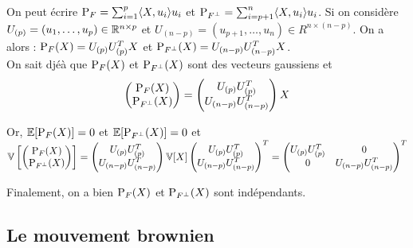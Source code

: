 On peut écrire $\mathrm{P}_F = \sum_{i=1}^p \langle X, u_i  \rangle u_i$ et $\mathrm{P}_{F^\bot} = \sum_{i=p+1}^n \langle X, u_i \rangle u_i$. Si on considère $U_{(p)} = (u_1,\ldots,u_p) \in \mathbb{R}^{n\times p}$ et $U_{(n-p)} = (u_{p+1},\ldots,u_{n}) \in R^{n \times (n-p)}$. On a alors : $\mathrm{P}_{F}(X) = U_{(p)} U_{(p)}^T X$  et $\mathrm{P}_{F^\bot}(X) = U_{(n-p)} U_{(n-p)}^T X$. \\

On sait djéà que $\mathrm{P}_F(X)$ et $\mathrm{P}_{F^\bot}(X)$ sont des vecteurs gaussiens et 
\[
\begin{pmatrix}
  \mathrm{P}_F(X) \\
  \mathrm{P}_{F^\bot}(X)
\end{pmatrix} 
=
\begin{pmatrix}
  U_{(p)}U_{(p)}^T \\
  U_{(n-p)}U_{(n-p)}^T
\end{pmatrix}
X
\]

Or, $\mathbb{E}[\mathrm{P}_F(X) ] = 0$ et $\mathbb{E}[\mathrm{P}_{F^\bot}(X)] = 0$ et
$\mathbb{V}\left[
\begin{pmatrix}
  \mathrm{P}_F(X) \\
  \mathrm{P}_{F^\bot}(X)
\end{pmatrix}\right]
=
\begin{pmatrix}
  U_{(p)}U_{(p)}^T \\
  U_{(n-p)}U_{(n-p)}^T
\end{pmatrix}
\mathbb{V}[X]
\begin{pmatrix}
  U_{(p)}U_{(p)}^T \\
  U_{(n-p)}U_{(n-p)}^T
\end{pmatrix}^T
=
\begin{pmatrix}
  U_{(p)}U_{(p)}^T  & 0\\
  0 & U_{(n-p)}U_{(n-p)}^T
\end{pmatrix}^T$

Finalement, on a bien $\mathrm{P}_F(X)$ et $\mathrm{P}_{F^\bot}(X)$ sont indépendants.

\subsection{Le mouvement brownien}

